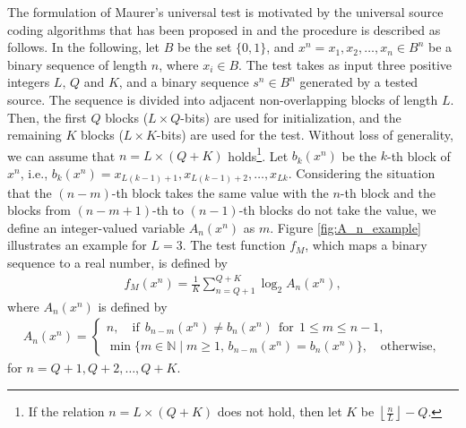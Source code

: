 The formulation of Maurer's universal test is motivated by the universal source coding algorithms that has been proposed in \cite{elias1987interval,willems1989universal} and the procedure is described as follows. In the following, let $B$ be the set $\{0,1\}$, and $x^n = x_1,x_2,\dots,x_n \in B^n$ be a binary sequence of length $n$, where $x_i\in B$. The test takes as input three positive integers $L,\,Q$ and $K$, and a binary sequence $s^n \in B^n$ generated by a tested source. The sequence is divided into adjacent non-overlapping blocks of length $L$. Then, the first $Q$ blocks ($L\times Q$-bits) are used for initialization, and the remaining $K$ blocks ($L\times K$-bits) are used for the test. Without loss of generality, we can assume that $n=L\times(Q+K)$ holds\footnote{%
If the relation $n=L\times(Q+K)$ does not hold, then let $K$ be $\left\lfloor \frac{n}{L} \right\rfloor - Q$.
}. 
%
Let $b_k(x^n)$ be the $k$-th block of $x^n$, i.e., $b_k(x^n) = x_{L(k-1)+1}, x_{L(k-1)+2}, \dots, x_{Lk}$. Considering the situation that the $(n-m)$-th block takes the same value with the $n$-th block and the blocks from $(n-m+1)$-th to $(n-1)$-th blocks do not take the value, we define an integer-valued variable $A_n(x^n)$ as $m$. 
Figure \ref{fig:A_n_example} illustrates an example for $L=3$. The test function $f_M$, which maps a binary sequence to a real number, is defined by 
\begin{align}\label{eq:fM}
	f_M(x^n) = \frac{1}{K} \sum_{n=Q+1}^{Q+K} \log_2 A_n(x^n),
\end{align}
where $A_n(x^n)$ is defined by
\begin{align}\label{eq:An}
	A_{n}(x^n) = \left\{ \begin{array}{ll}
	n, \quad \text{if} \:\: b_{n-m}(x^n) \neq b_n(x^n) \:\: \text{for} \:\: 1 \leq m \leq n-1, \\
	\min \{ m\in\mathbb{N} \mid m \geq 1,\, b_{n-m}(x^n) = b_n(x^n) \}, \quad \text{otherwise},
	\end{array} \right.
\end{align}
for $n=Q+1,Q+2,\dots,Q+K$.
